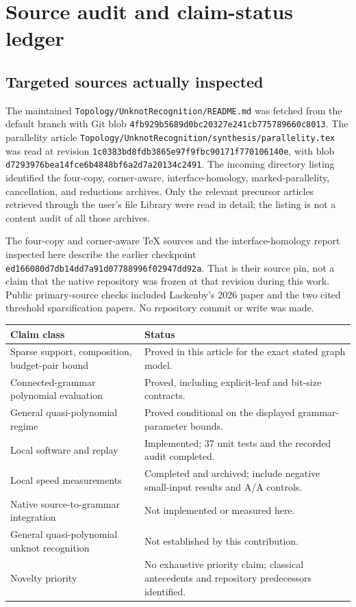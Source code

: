 \documentclass[11pt,a4paper]{article}
\theoremstyle{definition}
\theoremstyle{remark}
\newcommand{\code}[1]{\nolinkurl{#1}}
\newcommand{\pin}{\code{1c0383bd8fdb3865e97f9fbc90171f770106140e}}
\begin{document}
\appendix
\section{Source audit and claim-status ledger}
\label{app:audit}
\subsection{Targeted sources actually inspected}
The maintained \code{Topology/UnknotRecognition/README.md} was fetched from the default branch with Git blob
\code{4fb929b5689d0bc20327e241cb775789660c8013}.
The parallelity article \code{Topology/UnknotRecognition/synthesis/parallelity.tex}
was read at revision \pin, with blob
\code{d7293976bea14fce6b4848bf6a2d7a20134c2491}.
The incoming directory listing identified the four-copy, corner-aware, interface-homology, marked-parallelity, cancellation, and reductions archives. Only the relevant precursor articles retrieved through the user's file Library were read in detail; the listing is not a content audit of all those archives.

The four-copy and corner-aware TeX sources and the interface-homology report inspected here describe the earlier checkpoint
\code{ed166080d7db14dd7a91d07788996f02947dd92a}.
That is their source pin, not a claim that the native repository was frozen at that revision during this work. Public primary-source checks included Lackenby's 2026 paper and the two cited threshold sparsification papers. No repository commit or write was made.

\begin{longtable}{p{}p{}}
\toprule
Claim class & Status\\
\midrule
\endhead
Sparse support, composition, budget-pair bound & Proved in this article for the exact stated graph model.\\
Connected-grammar polynomial evaluation & Proved, including explicit-leaf and bit-size contracts.\\
General quasi-polynomial regime & Proved conditional on the displayed grammar-parameter bounds.\\
Local software and replay & Implemented; 37 unit tests and the recorded audit completed.\\
Local speed measurements & Completed and archived; include negative small-input results and A/A controls.\\
Native source-to-grammar integration & Not implemented or measured here.\\
General quasi-polynomial unknot recognition & Not established by this contribution.\\
Novelty priority & No exhaustive priority claim; classical antecedents and repository predecessors identified.\\
\bottomrule
\end{longtable}
\end{document}
